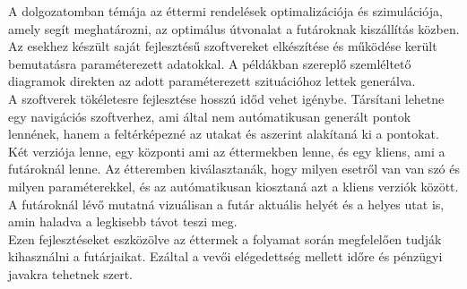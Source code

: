 
A dolgozatomban témája az éttermi rendelések optimalizációja és szimulációja, amely segít meghatározni, az optimálus útvonalat a futároknak kiszállítás közben. Az esekhez készült saját fejlesztésű szoftvereket elkészítése és működése került bemutatásra paraméterezett adatokkal. A példákban szereplő szemléltető diagramok direkten az adott paraméterezett szituációhoz lettek generálva.\\
A szoftverek tökéletesre fejlesztése hosszú időd vehet igénybe. Társítani lehetne egy navigációs szoftverhez, ami által nem autómatikusan generált pontok lennének, hanem a feltérképezné az utakat és aszerint alakítaná ki a pontokat. Két verziója lenne, egy központi ami az éttermekben lenne, és egy kliens, ami a futároknál lenne. Az étteremben kiválasztanák, hogy milyen esetről van van szó és milyen paraméterekkel, és az autómatikusan kiosztaná azt a kliens verziók között. A futároknál lévő mutatná vizuálisan a futár aktuális helyét és a helyes utat is, amin haladva a legkisebb távot teszi meg. \\ 
Ezen fejlesztéseket eszközölve az éttermek a folyamat során megfelelően tudják kihasználni a futárjaikat. Ezáltal a vevői elégedettség mellett időre és pénzügyi javakra tehetnek szert.